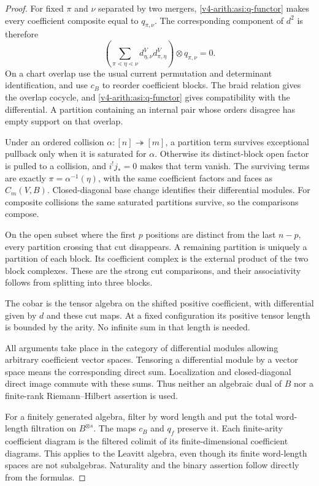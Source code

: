 \begin{proof}
For fixed $\pi$ and $\nu$ separated by two mergers,
\eqref{v4-arith:asi:q-functor} makes every coefficient composite equal to
$q_{\pi,\nu}$. The corresponding component of $d^2$ is therefore
\[
 \left(\sum_{\pi\lessdot\eta\lessdot\nu}
 d^V_{\eta,\nu}d^V_{\pi,\eta}\right)\otimes q_{\pi,\nu}=0.
\]
On a chart overlap use the usual current permutation and determinant
identification, and use $c_B$ to reorder coefficient blocks. The braid
relation gives the overlap cocycle, and \eqref{v4-arith:asi:q-functor} gives
compatibility with the differential. A partition containing an internal
pair whose orders disagree has empty support on that overlap.

Under an ordered collision $\alpha:[n]\twoheadrightarrow[m]$, a partition
term survives exceptional pullback only when it is saturated for $\alpha$.
Otherwise its distinct-block open factor is pulled to a collision, and
$i^!j_*=0$ makes that term vanish. The surviving terms are exactly
$\pi=\alpha^{-1}(\eta)$, with the same coefficient factors and faces as
$C_m(V,B)$. Closed-diagonal base change identifies their differential
modules. For composite collisions the same saturated partitions survive,
so the comparisons compose.

On the open subset where the first $p$ positions are distinct from the
last $n-p$, every partition crossing that cut disappears. A remaining
partition is uniquely a partition of each block. Its coefficient complex
is the external product of the two block complexes. These are the strong
cut comparisons, and their associativity follows from splitting into three
blocks.

The cobar is the tensor algebra on the shifted positive
coefficient, with differential given by $d$ and these cut maps. At a fixed
configuration its positive tensor length is bounded by the arity. No
infinite sum in that length is needed.

All arguments take place in the category of differential modules allowing
arbitrary coefficient vector spaces. Tensoring a differential module by
a vector space means the corresponding direct sum. Localization and
closed-diagonal direct image commute with these sums. Thus neither an
algebraic dual of $B$ nor a finite-rank Riemann--Hilbert assertion is used.

For a finitely generated algebra, filter by word length
and put the total word-length filtration on $B^{\otimes s}$. The maps
$c_B$ and $q_f$ preserve it. Each finite-arity coefficient diagram is the
filtered colimit of its finite-dimensional coefficient diagrams. This
applies to the Leavitt algebra, even though its finite word-length spaces
are not subalgebras. Naturality and the binary assertion follow directly
from the formulas.
\end{proof}

